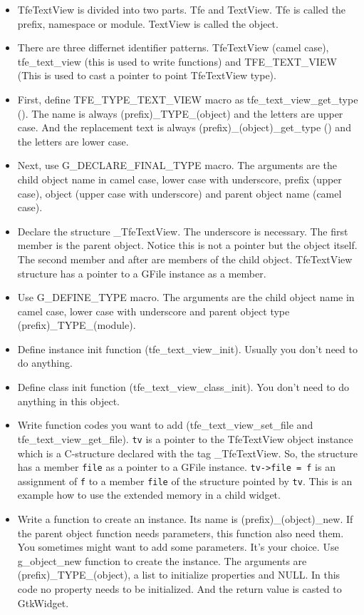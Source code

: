 \begin{itemize}
\tightlist
\item
  TfeTextView is divided into two parts. Tfe and TextView. Tfe is called
  the prefix, namespace or module. TextView is called the object.
\item
  There are three differnet identifier patterns. TfeTextView (camel
  case), tfe\_text\_view (this is used to write functions) and
  TFE\_TEXT\_VIEW (This is used to cast a pointer to point TfeTextView
  type).
\item
  First, define TFE\_TYPE\_TEXT\_VIEW macro as
  tfe\_text\_view\_get\_type (). The name is always
  (prefix)\_TYPE\_(object) and the letters are upper case. And the
  replacement text is always (prefix)\_(object)\_get\_type () and the
  letters are lower case.
\item
  Next, use G\_DECLARE\_FINAL\_TYPE macro. The arguments are the child
  object name in camel case, lower case with underscore, prefix (upper
  case), object (upper case with underscore) and parent object name
  (camel case).
\item
  Declare the structure \_TfeTextView. The underscore is necessary. The
  first member is the parent object. Notice this is not a pointer but
  the object itself. The second member and after are members of the
  child object. TfeTextView structure has a pointer to a GFile instance
  as a member.
\item
  Use G\_DEFINE\_TYPE macro. The arguments are the child object name in
  camel case, lower case with underscore and parent object type
  (prefix)\_TYPE\_(module).
\item
  Define instance init function (tfe\_text\_view\_init). Usually you
  don't need to do anything.
\item
  Define class init function (tfe\_text\_view\_class\_init). You don't
  need to do anything in this object.
\item
  Write function codes you want to add (tfe\_text\_view\_set\_file and
  tfe\_text\_view\_get\_file). \passthrough{\lstinline!tv!} is a pointer
  to the TfeTextView object instance which is a C-structure declared
  with the tag \_TfeTextView. So, the structure has a member
  \passthrough{\lstinline!file!} as a pointer to a GFile instance.
  \passthrough{\lstinline!tv->file = f!} is an assignment of
  \passthrough{\lstinline!f!} to a member \passthrough{\lstinline!file!}
  of the structure pointed by \passthrough{\lstinline!tv!}. This is an
  example how to use the extended memory in a child widget.
\item
  Write a function to create an instance. Its name is
  (prefix)\_(object)\_new. If the parent object function needs
  parameters, this function also need them. You sometimes might want to
  add some parameters. It's your choice. Use g\_object\_new function to
  create the instance. The arguments are (prefix)\_TYPE\_(object), a
  list to initialize properties and NULL. In this code no property needs
  to be initialized. And the return value is casted to GtkWidget.
\end{itemize}

